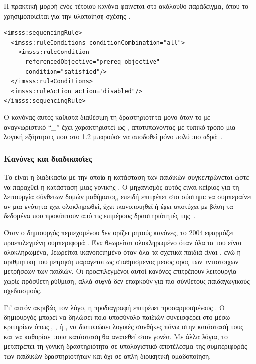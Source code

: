 Η πρακτική μορφή ενός τέτοιου κανόνα φαίνεται στο ακόλουθο παράδειγμα, όπου το  χρησιμοποιείται για την υλοποίηση σχέσης .

{\selectfont

\begin{verbatim}
<imsss:sequencingRule>
  <imsss:ruleConditions conditionCombination="all">
    <imsss:ruleCondition 
      referencedObjective="prereq_objective" 
      condition="satisfied"/>
  </imsss:ruleConditions>
  <imsss:ruleAction action="disabled"/>
</imsss:sequencingRule>
\end{verbatim}
}

Ο κανόνας αυτός καθιστά διαθέσιμη τη δραστηριότητα μόνο όταν το  με αναγνωριστικό ``\_'' έχει χαρακτηριστεί ως , αποτυπώνοντας με τυπικό τρόπο μια λογική εξάρτησης που στο  1.2 μπορούσε να αποδοθεί μόνο πολύ πιο αδρά~\cite{ADL_SCORM2004_SN, IMS_SS_InfoModel}.

\subsubsection{Κανόνες και διαδικασίες }

Το  είναι η διαδικασία με την οποία η κατάσταση των παιδικών  συγκεντρώνεται ώστε να παραχθεί η κατάσταση μιας γονικής . Ο μηχανισμός αυτός είναι καίριος για τη λειτουργία σύνθετων δομών μαθήματος, επειδή επιτρέπει στο σύστημα να συμπεραίνει αν μια ενότητα έχει ολοκληρωθεί, έχει ικανοποιηθεί ή έχει αποτύχει με βάση τα δεδομένα που προκύπτουν από τις επιμέρους δραστηριότητές της~\cite{ADL_SCORM2004_SN, IMS_SS_RollupModel}.

Όταν ο δημιουργός περιεχομένου δεν ορίζει ρητούς κανόνες, το  2004 εφαρμόζει προεπιλεγμένη συμπεριφορά . Ένα  θεωρείται ολοκληρωμένο όταν όλα τα  του είναι ολοκληρωμένα, θεωρείται ικανοποιημένο όταν όλα τα σχετικά παιδιά είναι , ενώ η αριθμητική του μέτρηση παράγεται ως σταθμισμένος μέσος όρος των αντίστοιχων μετρήσεων των παιδιών. Οι προεπιλεγμένοι αυτοί κανόνες επιτρέπουν λειτουργία χωρίς πρόσθετη ρύθμιση, αλλά συχνά δεν επαρκούν για πιο σύνθετους παιδαγωγικούς σχεδιασμούς.

Γι' αυτόν ακριβώς τον λόγο, η προδιαγραφή επιτρέπει προσαρμοσμένους . Ο δημιουργός μπορεί να δηλώσει ποιο υποσύνολο παιδιών συνεισφέρει στο  μέσω κριτηρίων όπως , ,  ή , να διατυπώσει λογικές συνθήκες πάνω στην κατάστασή τους και να καθορίσει ποια κατάσταση θα ανατεθεί στον γονέα. Με άλλα λόγια, το  μετατρέπει τη γονική δραστηριότητα σε υπολογιστικό αποτέλεσμα της συμπεριφοράς των παιδικών δραστηριοτήτων και όχι σε απλή διοικητική ομαδοποίηση.

